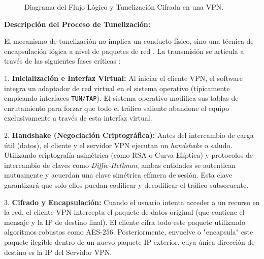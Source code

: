\documentclass[a4paper,12pt]{article}
\begin{document}
\begin{figure}[H]
    \caption{Diagrama del Flujo Lógico y Tunelización Cifrada en una VPN.}
\end{figure}

\textbf{Descripción del Proceso de Tunelización:}

El mecanismo de tunelización no implica un conducto físico, sino una técnica de encapsulación lógica a nivel de paquetes de red \cite{ibm_vpn_steps}. La transmisión se articula a través de las siguientes fases críticas \cite{nordvpn_how_it_works, ibm_vpn_steps, fortinet_vpn_how}:

1. \textbf{Inicialización e Interfaz Virtual:} Al iniciar el cliente VPN, el software integra un adaptador de red virtual en el sistema operativo (típicamente empleando interfaces \texttt{TUN/TAP}). El sistema operativo modifica sus tablas de enrutamiento para forzar que todo el tráfico saliente abandone el equipo exclusivamente a través de esta interfaz virtual.

2. \textbf{Handshake (Negociación Criptográfica):} Antes del intercambio de carga útil (datos), el cliente y el servidor VPN ejecutan un \textit{handshake} o saludo. Utilizando criptografía asimétrica (como RSA o Curva Elíptica) y protocolos de intercambio de claves como \textit{Diffie-Hellman}, ambas entidades se autentican mutuamente y acuerdan una clave simétrica efímera de sesión. Esta clave garantizará que solo ellos puedan codificar y decodificar el tráfico subsecuente.

3. \textbf{Cifrado y Encapsulación:} Cuando el usuario intenta acceder a un recurso en la red, el cliente VPN intercepta el paquete de datos original (que contiene el mensaje y la IP de destino final). El cliente cifra todo este paquete utilizando algoritmos robustos como AES-256. Posteriormente, envuelve o "encapsula" este paquete ilegible dentro de un nuevo paquete IP exterior, cuya única dirección de destino es la IP del Servidor VPN.
\end{document}
